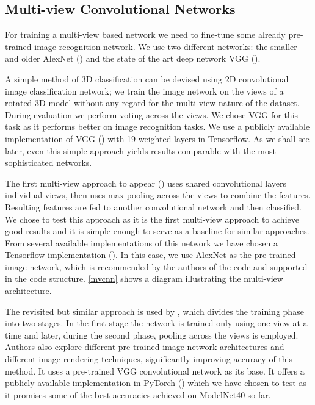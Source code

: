 \subsection{Multi-view Convolutional Networks}
For training a multi-view based network we need to fine-tune some already pre-trained image recognition network. We use two different networks: the smaller and older AlexNet (\cite{krizhevsky_imagenet_2012}) and the state of the art deep network VGG (\cite{simonyan_very_2014}). \par
A simple method of 3D classification can be devised using 2D convolutional image classification network; we train the image network on the views of a rotated 3D model without any regard for the multi-view nature of the dataset. During evaluation we perform voting across the views. We chose VGG for this task as it performs better on image recognition tasks. We use a publicly available implementation of VGG (\cite{machrisaa_vgg_2017}) with 19 weighted layers in Tensorflow. As we shall see later, even this simple approach yields results comparable with the most sophisticated networks.
\par
The first multi-view approach to appear (\cite{su_multi-view_2015}) uses shared convolutional layers individual views, then uses max pooling across the views to combine the features. Resulting features are fed to another convolutional network and then classified. We chose to test this approach as it is the first multi-view approach to achieve good results and it is simple enough to serve as a baseline for similar approaches. From several available implementations of this network we have chosen a Tensorflow implementation (\cite{lee_multi-view_2016}). In this case, we use AlexNet as the pre-trained image network, which is recommended by the authors of the code and supported in the code structure. \autoref{mvcnn} shows a diagram illustrating the multi-view architecture. \par
The revisited but similar approach is used by \cite{su_deeper_2018}, which divides the training phase into two stages. In the first stage the network is trained only using one view at a time and later, during the second phase, pooling across the views is employed. Authors also explore different pre-trained image network architectures and different image rendering techniques, significantly improving accuracy of this method. It uses a pre-trained VGG convolutional network as its base. It offers a publicly available implementation in PyTorch (\cite{su_multi-view_2018}) which we have chosen to test as it promises some of the best accuracies achieved on ModelNet40 so far.

